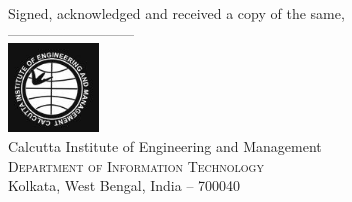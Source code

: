 \documentclass[11pt, a4paper]{thesis}
\begin{document}
\begin{titlepage}
\begin{center}
Signed, acknowledged and received a copy of the same,\\
\vspace{0.5in}
---------------------------\\
\vfill
\includegraphics[width=0.18\textwidth]{ciem-logo.jpg}\\[0.1in]
\Large{Calcutta Institute of Engineering and Management}\\
\normalsize
\textsc{Department of Information Technology}\\
Kolkata, West Bengal, India -- 700040 \\
\vspace{0.2cm}

\end{center}

\end{titlepage}
\end{document}
